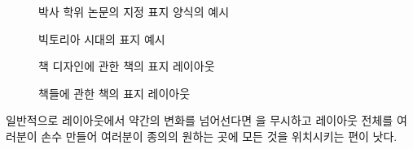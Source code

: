 \begin{figure}
\centering
\begin{showtitle}
\titleDS
\end{showtitle}
\caption{박사 학위 논문의 지정 표지 양식의 예시}\label{figure:titleDS}
\end{figure}

\begin{figure}%
\centering
{\titleRB}
\caption{빅토리아 시대의 표지 예시}\label{figure:titleRB}
\end{figure}

\begin{figure}
\centering
\begin{showtitle}
\titleDB
\end{showtitle}
\caption{책 디자인에 관한 책의 표지 레이아웃}\label{figure:titleDB}
\end{figure}

\begin{figure}
\centering
\begin{showtitle}
\titleGM
\end{showtitle}
\caption{책들에 관한 책의 표지 레이아웃}\label{figure:titleGM}
\end{figure}

일반적으로 \cmd{\maketitle} 레이아웃에서 약간의 변화를 넘어선다면
\cmd{\maketitle}을 무시하고 레이아웃 전체를 여러분이 손수 만들어 여러분이
종의의 원하는 곳에 모든 것을 위치시키는 편이 낫다.

